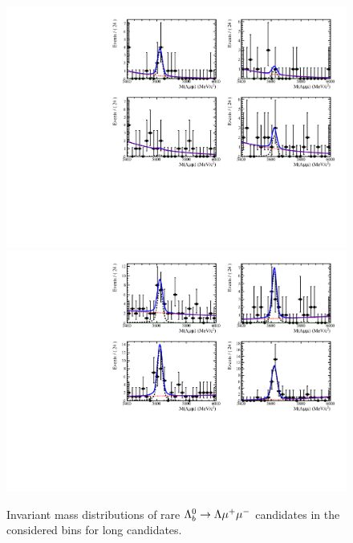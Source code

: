 \begin{figure}
\centering
\includegraphics[width=1.\textwidth]{Lmumu/figs/MassFits/q2_fits_LL_plot2.pdf}
\includegraphics[width=1.\textwidth]{Lmumu/figs/MassFits/q2_fits_LL_plot1.pdf}
\caption{Invariant mass distributions of rare $\Lambda^0_b\rightarrow\Lambda\mu^+\mu^-$ candidates in the considered \qsq bins
 for long candidates. }
\label{fig:Lb_differentialFitLL}
\end{figure}





